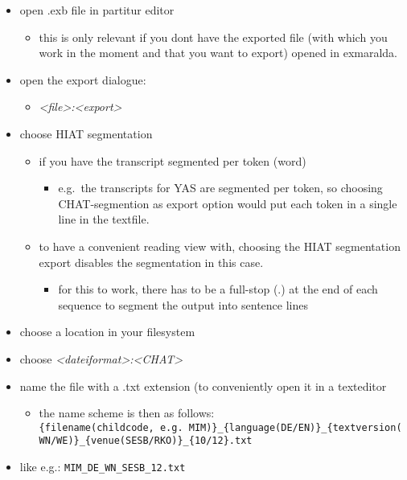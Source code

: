 \documentclass[
  12pt,
]{article}
\providecommand{\tightlist}{%
  \setlength{\itemsep}{0pt}\setlength{\parskip}{0pt}}
\begin{document}
\begin{itemize}
\tightlist
\item
  open .exb file in partitur editor

  \begin{itemize}
  \tightlist
  \item
    this is only relevant if you dont have the exported file (with which
    you work in the moment and that you want to export) opened in
    exmaralda.
  \end{itemize}
\item
  open the export dialogue:

  \begin{itemize}
  \tightlist
  \item
    \emph{\textless file\textgreater:\textless export\textgreater{}}
  \end{itemize}
\item
  choose HIAT segmentation

  \begin{itemize}
  \tightlist
  \item
    if you have the transcript segmented per token (word)

    \begin{itemize}
    \tightlist
    \item
      e.g.~the transcripts for YAS are segmented per token, so choosing
      CHAT-segmention as export option would put each token in a single
      line in the textfile.
    \end{itemize}
  \item
    to have a convenient reading view with, choosing the HIAT
    segmentation export disables the segmentation in this case.

    \begin{itemize}
    \tightlist
    \item
      for this to work, there has to be a full-stop (.) at the end of
      each sequence to segment the output into sentence lines
    \end{itemize}
  \end{itemize}
\item
  choose a location in your filesystem
\item
  choose
  \emph{\textless dateiformat\textgreater:\textless CHAT\textgreater{}}
\item
  name the file with a .txt extension (to conveniently open it in a
  texteditor

  \begin{itemize}
  \tightlist
  \item
    the name scheme is then as follows:
    \texttt{\{filename(childcode,\ e.g.\ MIM)\}\_\{language(DE/EN)\}\_\{textversion(WN/WE)\}\_\{venue(SESB/RKO)\}\_\{10/12\}.txt}
  \end{itemize}
\item
  like e.g.: \texttt{MIM\_DE\_WN\_SESB\_12.txt}


\end{itemize}
\end{document}
